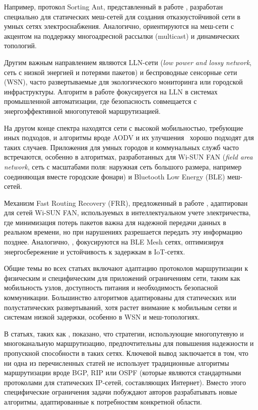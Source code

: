 \documentclass[%
]{report}
\begin{document}
Например, протокол Sorting Ant,
представленный в работе \textcite{LI2020570},
разработан специально для статических меш-сетей
для создания отказоустойчивой сети в
умных сетях электроснабжения.
Аналогично, \textcite{PAN2012952}
ориентируются на меш-сети с акцентом на
поддержку многоадресной рассылки (multicast)
и динамических топологий.

Другим важным направлением являются LLN-сети
(\emph{low power and lossy network},
сеть с низкой энергией и потерями пакетов)
и беспроводные сенсорные сети (WSN),
часто развертываемые для экологического мониторинга
или городской инфраструктуры.
Алгоритм в работе \textcite{KRENTZ202457}
фокусируется на LLN в системах промышленной автоматизации,
где безопасность совмещается с  энергоэффективной
многопутевой маршрутизацией.

На другом конце спектра находятся сети
с высокой мобильностью, требующие иных подходов,
и алгоритмы вроде AODV и их улучшения~\cite{LIU201321}
хорошо подходят для таких случаев.
Приложения для умных городов и коммунальных служб
часто встречаются, особенно в алгоритмах,
разработанных для Wi-SUN FAN (\emph{field area network},
сеть с масштабами поля: наружная сеть большого размера,
например соединяющая вместе городские фонари)
и Bluetooth Low Energy (BLE) меш-сетей.

Механизм Fast Routing Recovery (FRR),
предложенный в работе \textcite{HECK2025110364},
адаптирован для сетей Wi-SUN FAN,
используемых в интеллектуальном учете электричества,
где минимизация потерь пакетов важна для
надежной передачи данных в реальном времени,
но при нарушениях разрешается передать эту информацию позднее.
Аналогично, \textcite{HERNANDEZSOLANA2022109114},
фокусируются на BLE Mesh сетях,
оптимизируя энергосбережение и устойчивость к задержкам
в IoT-сетях.

Общие темы во всех статьях включают
адаптацию протоколов маршрутизации к
физическим и специфическим для приложений
ограничениям сети, таким как мобильность узлов,
доступность питания и необходимость безопасной
коммуникации. Большинство алгоритмов адаптированы
для статических или полустатических развертываний,
хотя растет внимание к мобильным сетяи и системам низкой задержки,
особенно в WSN и меш-топологиях.

В статьях, таких как \textcite{LI2011458},
показано, что стратегии, использующие многопутевую
и многоканальную маршрутизацию, предпочтительны для
повышения надежности и пропускной способности в таких сетях.
Ключевой вывод заключается в том, что ни
одна из перечисленных статей не использует
традиционные алгоритмы маршрутизации вроде
BGP, RIP или OSPF (которые являются стандартными
протоколами для статических IP-сетей,
составляющих Интернет). Вместо этого специфические
ограничения задачи побуждают авторов разрабатывать
новые алгоритмы, адаптированные к потребностям
конкретной области.
\end{document}
